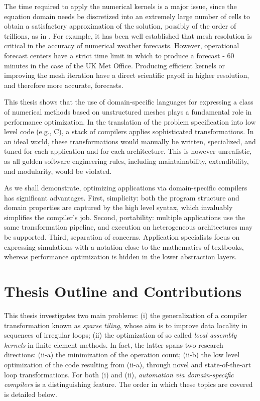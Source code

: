 The time required to apply the numerical kernels is a major issue, since the equation domain needs be discretized into an extremely large number of cells to obtain a satisfactory approximation of the solution, possibly of the order of trillions, as in \cite{Rossinelli2013}. For example, it has been well established that mesh resolution is critical in the accuracy of numerical weather forecasts. However, operational forecast centers have a strict time limit in which to produce a forecast - 60 minutes in the case of the UK Met Office. Producing efficient kernels or improving the mesh iteration have a direct scientific payoff in higher resolution, and therefore more accurate, forecasts. 

This thesis shows that the use of domain-specific languages for expressing a class of numerical methods based on unstructured meshes plays a fundamental role in performance optimization. In the translation of the problem specification into low level code (e.g., C), a stack of compilers applies sophisticated transformations. In an ideal world, these transformations would manually be written, specialized, and tuned for each application and for each architecture. This is however unrealistic, as all golden software engineering rules, including maintainability, extendibility, and modularity, would be violated.

As we shall demonstrate, optimizing applications via domain-specific compilers has significant advantages. First, simplicity: both the program structure and domain properties are captured by the high level syntax, which invaluably simplifies the compiler's job. Second, portability: multiple applications use the same transformation pipeline, and execution on heterogeneous architectures may be supported. Third, separation of concerns. Application specialists focus on expressing simulations with a notation close to the mathematics of textbooks, whereas performance optimization is hidden in the lower abstraction layers. 

\section{Thesis Outline and Contributions}
\label{sec:contributions}
This thesis investigates two main problems: (i) the generalization of a compiler transformation known as {\em sparse tiling}, whose aim is to improve data locality in sequences of irregular loops; (ii) the optimization of so called {\em local assembly kernels} in finite element methods. In fact, the latter spans two research directions: (ii-a) the minimization of the operation count; (ii-b) the low level optimization of the code resulting from (ii-a), through novel and state-of-the-art loop transformations. For both (i) and (ii), {\it automation via domain-specific compilers} is a distinguishing feature. The order in which these topics are covered is detailed below.

